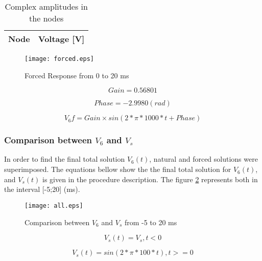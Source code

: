 \begin{table}[h]
  \centering
  \begin{tabular}{|l|r|}
    \hline    
    {\bf Node} & {\bf Voltage [V]} \\ \hline
    
  \end{tabular}
  \caption{Complex amplitudes in the nodes}
  \label{tab:solveNos_tab}
\end{table}

\begin{figure}[h] \centering
\texttt{[image: forced.eps]}
\caption{Forced Response from 0 to 20 ms}
\label{fig:forced}
\end{figure}

\begin{equation}
    Gain = 0.56801 
    \label{}
\end{equation}

\begin{equation}
    Phase = - 2.9980 (rad)
    \label{}
\end{equation}

\begin{equation}
    V_6f = Gain \times sin (2 * \pi * 1000 * t + Phase)
    \label{}
\end{equation}


\subsubsection{Comparison between $V_6$ and $V_s$ }

In order to find the final total solution $V_6(t)$, natural and forced solutions were superimposed. The equations bellow show the the final total solution for $V_6(t)$, and $V_s(t)$ is given in the procedure description. The figure \ref{fig:all} represents both in the interval [-5;20] (ms).

\begin{figure}[h] \centering
\texttt{[image: all.eps]}
\caption{Comparison between $V_6$ and $V_s$  from -5 to 20 ms}
\label{fig:all}
\end{figure}

\begin{equation}
    V_s (t) = V_s ,   t<0
    \label{}
\end{equation}

\begin{equation}
    V_s (t) = sin(2 * \pi * 100 * t) , t>=0
    \label{}
\end{equation}

